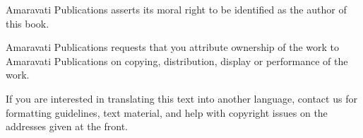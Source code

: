 {Amaravati Publications asserts its moral right to be identified as the author of this book.

Amaravati Publications requests that you attribute ownership of the work to Amaravati Publications on copying, distribution, display or performance of the work.

If you are interested in translating this text into another language, contact us for formatting guidelines, text material, and help with copyright issues on the addresses given at the front.

}
